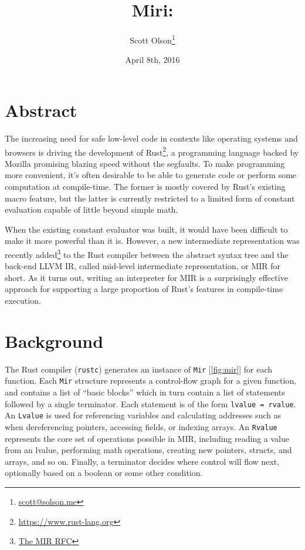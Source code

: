 \documentclass[twocolumn]{article}
\newcommand{\rust}[1]{\texttt{#1}}
\begin{document}
\title{Miri: \\ }
\author{Scott Olson\footnote{\href{mailto:scott@solson.me}{scott@solson.me}} \\
  }
\date{April 8th, 2016}
\maketitle

\section{Abstract}

The increasing need for safe low-level code in contexts like operating systems and browsers is
driving the development of Rust\footnote{\url{https://www.rust-lang.org}}, a programming language
backed by Mozilla promising blazing speed without the segfaults. To make programming more
convenient, it's often desirable to be able to generate code or perform some computation at
compile-time. The former is mostly covered by Rust's existing macro feature, but the latter is
currently restricted to a limited form of constant evaluation capable of little beyond simple math.

When the existing constant evaluator was built, it would have been difficult to make it more
powerful than it is. However, a new intermediate representation was recently
added\footnote{\href{https://github.com/rust-lang/rfcs/blob/master/text/1211-mir.md}{The MIR RFC}}
to the Rust compiler between the abstract syntax tree and the back-end LLVM IR, called mid-level
intermediate representation, or MIR for short. As it turns out, writing an interpreter for MIR is a
surprisingly effective approach for supporting a large proportion of Rust's features in compile-time
execution.

\section{Background}

The Rust compiler (\texttt{rustc}) generates an instance of \rust{Mir} [\autoref{fig:mir}] for each
function. Each \rust{Mir} structure represents a control-flow graph for a given function, and
contains a list of ``basic blocks'' which in turn contain a list of statements followed by a single
terminator. Each statement is of the form \rust{lvalue = rvalue}. An \rust{Lvalue} is used for
referencing variables and calculating addresses such as when dereferencing pointers, accessing
fields, or indexing arrays. An \rust{Rvalue} represents the core set of operations possible in MIR,
including reading a value from an lvalue, performing math operations, creating new pointers,
structs, and arrays, and so on. Finally, a terminator decides where control will flow next,
optionally based on a boolean or some other condition.
\end{document}
